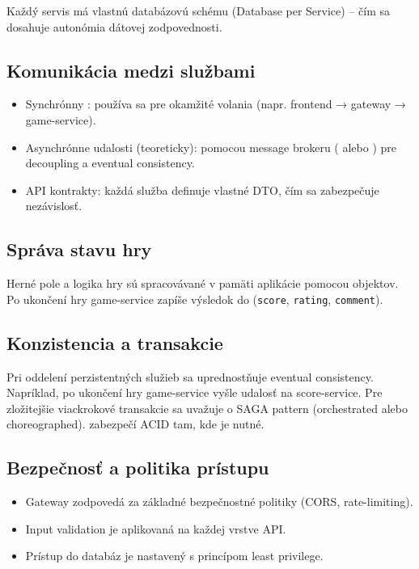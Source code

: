Každý servis má vlastnú databázovú schému (Database per Service) – čím sa dosahuje autonómia dátovej zodpovednosti.

\subsection{Komunikácia medzi službami}
\begin{itemize}
    \item Synchrónny : používa sa pre okamžité volania (napr. frontend → gateway → game-service).
    \item Asynchrónne udalosti (teoreticky): pomocou message brokeru ( alebo ) pre decoupling a eventual consistency.
    \item API kontrakty: každá služba definuje vlastné DTO, čím sa zabezpečuje nezávislosť.
\end{itemize}

\subsection{Správa stavu hry}
Herné pole a logika hry sú spracovávané v pamäti aplikácie pomocou objektov. Po ukončení hry game-service zapíše výsledok do  (\texttt{score}, \texttt{rating}, \texttt{comment}).

\subsection{Konzistencia a transakcie}
Pri oddelení perzistentných služieb sa uprednostňuje eventual consistency. Napríklad, po ukončení hry game-service vyšle udalosť na score-service. Pre zložitejšie viackrokové transakcie sa uvažuje o SAGA pattern (orchestrated alebo choreographed).  zabezpečí ACID tam, kde je nutné.

\subsection{Bezpečnosť a politika prístupu}
\begin{itemize}
    \item Gateway zodpovedá za základné bezpečnostné politiky (CORS, rate-limiting).
    \item Input validation je aplikovaná na každej vrstve API.
    \item Prístup do databáz je nastavený s princípom least privilege.
\end{itemize}

